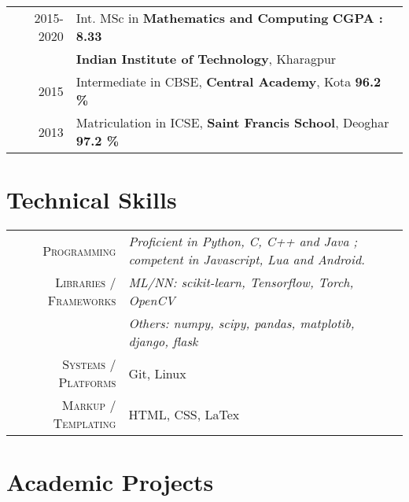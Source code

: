 \documentclass[a4paper,10pt]{extarticle} %
\begin{document}
\begin{tabular}{r|p{18cm}}	
2015-2020 & Int. MSc in \textbf{Mathematics and Computing} \hfill{\textbf{CGPA : 8.33}}\\
&\textbf{Indian Institute of Technology}, Kharagpur\\
2015 & Intermediate in CBSE, \textbf{Central Academy}, Kota  \hfill{\textbf{96.2 \%}}\\
2013 & Matriculation in ICSE, \textbf{Saint Francis School}, Deoghar  \hfill{\textbf{97.2 \%}}
\end{tabular}


\section{Technical Skills}

\begin{tabular}{r|p{18cm}}
\textsc{Programming} & \itshape{Proficient in} Python, C, C++ and Java ; \itshape{competent in} Javascript, Lua and Android. \\
\textsc{Libraries / Frameworks} & \itshape{ML/NN: }scikit-learn, Tensorflow, Torch, OpenCV\\
& \itshape{Others: }numpy, scipy, pandas, matplotib, django, flask\\
\textsc{Systems / Platforms} & Git, Linux\\
\textsc{Markup / Templating} & HTML, CSS, LaTex
\end{tabular}


\section{Academic Projects}
\end{document}
